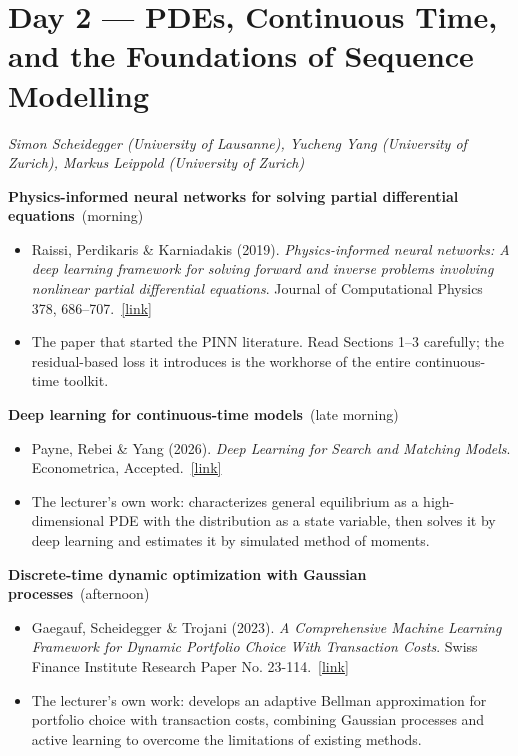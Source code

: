 \documentclass[11pt]{article}
\newcommand{\reading}[5]{%
  \item #1. \textit{#2}. #3.\ \href{#4}{[link]}%
}
\newcommand{\session}[2]{\smallskip\noindent\textbf{\color{accent}#1}\ {\small\color{notegray}(#2)}\par\nopagebreak\smallskip}
\begin{document}
\label{day2}
\section*{Day 2 --- PDEs, Continuous Time, and the Foundations of Sequence Modelling}
\textit{Simon Scheidegger (University of Lausanne), Yucheng Yang (University of Zurich), Markus Leippold (University of Zurich)}
\smallskip

\session{Physics-informed neural networks for solving partial differential equations}{morning}

\begin{itemize}
  \reading{Raissi, Perdikaris \& Karniadakis (2019)}{Physics-informed neural networks: A deep learning framework for solving forward and inverse problems involving nonlinear partial differential equations}{Journal of Computational Physics 378, 686--707}{https://doi.org/10.1016/j.jcp.2018.10.045}{}
  \item[] {\small\color{notegray}The paper that started the PINN literature. Read Sections 1--3 carefully; the residual-based loss it introduces is the workhorse of the entire continuous-time toolkit.}
\end{itemize}

\session{Deep learning for continuous-time models}{late morning}

\begin{itemize}
  \reading{Payne, Rebei \& Yang (2026)}{Deep Learning for Search and Matching Models}{Econometrica, Accepted}{https://ideas.repec.org/p/chf/rpseri/rp2505.html}{}
  \item[] {\small\color{notegray}The lecturer's own work: characterizes general equilibrium as a high-dimensional PDE with the distribution as a state variable, then solves it by deep learning and estimates it by simulated method of moments.}
\end{itemize}

\session{Discrete-time dynamic optimization with Gaussian processes}{afternoon}

\begin{itemize}
  \reading{Gaegauf, Scheidegger \& Trojani (2023)}{A Comprehensive Machine Learning Framework for Dynamic Portfolio Choice With Transaction Costs}{Swiss Finance Institute Research Paper No. 23-114}{https://papers.ssrn.com/sol3/papers.cfm?abstract_id=4543794}{}
  \item[] {\small\color{notegray} The lecturer’s own work: develops an adaptive Bellman approximation for portfolio choice with transaction costs, combining Gaussian processes and active learning to overcome the limitations of existing methods.} 


  
\end{itemize}
\end{document}
